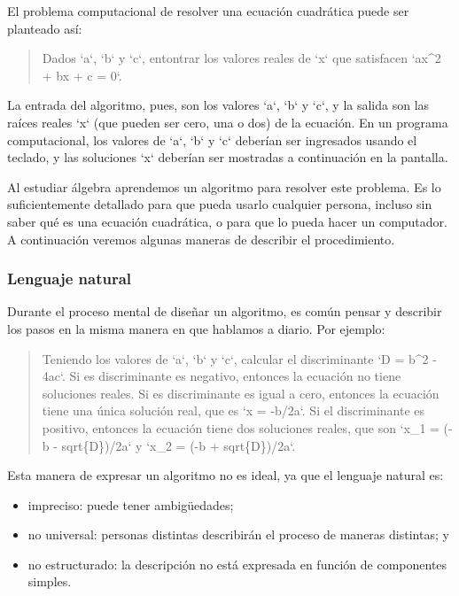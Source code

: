 El problema computacional de resolver una ecuación cuadrática puede ser
planteado así:

\begin{quote}
Dados `a`, `b` y `c`, entontrar los valores reales de `x` que satisfacen
`ax\^{}2 + bx + c = 0`.
\end{quote}

La entrada del algoritmo, pues, son los valores `a`, `b` y `c`, y la
salida son las raíces reales `x` (que pueden ser cero, una o dos) de la
ecuación. En un programa computacional, los valores de `a`, `b` y `c`
deberían ser ingresados usando el teclado, y las soluciones `x` deberían
ser mostradas a continuación en la pantalla.

Al estudiar álgebra aprendemos un algoritmo para resolver este problema.
Es lo suficientemente detallado para que pueda usarlo cualquier persona,
incluso sin saber qué es una ecuación cuadrática, o para que lo pueda
hacer un computador. A continuación veremos algunas maneras de describir
el procedimiento.

\subsubsection{Lenguaje natural}

Durante el proceso mental de diseñar un algoritmo, es común pensar y
describir los pasos en la misma manera en que hablamos a diario. Por
ejemplo:

\begin{quote}
Teniendo los valores de `a`, `b` y `c`, calcular el discriminante `D =
b\^{}2 - 4ac`. Si es discriminante es negativo, entonces la ecuación no
tiene soluciones reales. Si es discriminante es igual a cero, entonces
la ecuación tiene una única solución real, que es `x = -b/2a`. Si el
discriminante es positivo, entonces la ecuación tiene dos soluciones
reales, que son `x\_1 = (-b - sqrt\{D\})/2a` y `x\_2 = (-b +
sqrt\{D\})/2a`.
\end{quote}

Esta manera de expresar un algoritmo no es ideal, ya que el lenguaje
natural es:

\begin{itemize}
\item
  impreciso: puede tener ambigüedades;
\item
  no universal: personas distintas describirán el proceso de maneras
  distintas; y
\item
  no estructurado: la descripción no está expresada en función de
  componentes simples.
\end{itemize}

